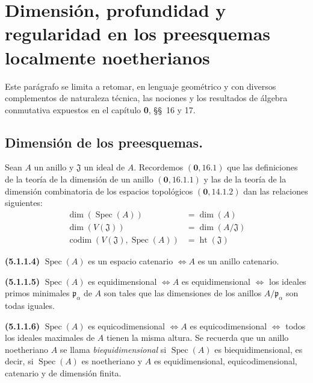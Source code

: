\section{Dimensión, profundidad y regularidad en los preesquemas localmente
noetherianos}

Este parágrafo se limita a retomar, en lenguaje geométrico y con diversos
complementos de naturaleza técnica, las nociones y los resultados de álgebra
conmutativa expuestos en el capítulo \textbf{0}, \S\S~16 y 17.

\subsection{Dimensión de los preesquemas.}

\begin{env}[5.1.1]
\label{IV.2.5.1.1-fr}
Sean $A$ un anillo y $\mathfrak J$ un ideal de $A$. Recordemos
$(\mathbf{0},16.1)$ que las definiciones de la teoría de la dimensión de un anillo
$(\mathbf{0},16.1.1)$ y las de la teoría de la dimensión combinatoria de los espacios
topológicos $(\mathbf{0},14.1.2)$ dan las relaciones siguientes:
\begin{align}
\dim(\operatorname{Spec}(A))&=\dim(A)
\tag{5.1.1.1}\label{IV.2.5.1.1.1-fr}\\
\dim(V(\mathfrak J))&=\dim(A/\mathfrak J)
\tag{5.1.1.2}\label{IV.2.5.1.1.2-fr}\\
\operatorname{codim}(V(\mathfrak J),\operatorname{Spec}(A))
&=\operatorname{ht}(\mathfrak J)
\tag{5.1.1.3}\label{IV.2.5.1.1.3-fr}
\end{align}
\par\noindent\textbf{(5.1.1.4)} $\operatorname{Spec}(A)$ es un espacio
catenario $\Longleftrightarrow A$ es un anillo catenario.
\par\noindent\textbf{(5.1.1.5)} $\operatorname{Spec}(A)$ es equidimensional
$\Longleftrightarrow A$ es equidimensional
$\Longleftrightarrow$ los ideales primos minimales $\mathfrak p_\alpha$ de
$A$ son tales que las dimensiones de los anillos $A/\mathfrak p_\alpha$ son
todas iguales.
\par\noindent\textbf{(5.1.1.6)} $\operatorname{Spec}(A)$ es
equicodimensional $\Longleftrightarrow A$ es equicodimensional
$\Longleftrightarrow$ todos los ideales maximales de $A$ tienen la misma
altura. Se recuerda que un anillo noetheriano $A$ se llama
\emph{biequidimensional} si $\operatorname{Spec}(A)$ es biequidimensional, es
decir, si $\operatorname{Spec}(A)$ es noetheriano y $A$ es equidimensional,
equicodimensional, catenario y de dimensión finita.
\end{env}

